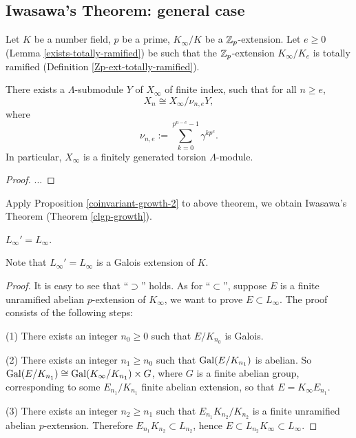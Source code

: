 \subsection{Iwasawa's Theorem: general case}

Let $K$ be a number field, $p$ be a prime,
$K_\infty/K$ be a ${\mathbb {Z}}_p$-extension.
Let $e\geq 0$ (Lemma \ref{exists-totally-ramified})
be such that the ${\mathbb {Z}}_p$-extension $K_\infty/K_e$
is totally ramified (Definition \ref{Zp-ext-totally-ramified}).

\begin{thm}
\label{Xn-isom-qout}
There exists a $\Lambda$-submodule $Y$ of $X_\infty$ of finite index,
such that for all $n\geq e$,
$$
X_n\cong X_\infty/\nu_{n,e}Y,
$$
where
$$
\nu_{n,e}:=\sum_{k=0}^{p^{n-e}-1}\gamma^{kp^e}.
$$
In particular, $X_\infty$ is a finitely generated torsion $\Lambda$-module.
\end{thm}

\begin{proof}
...
\end{proof}

Apply Proposition \ref{coinvariant-growth-2} to above theorem,
we obtain Iwasawa's Theorem (Theorem \ref{clgp-growth}).

\iffalse
\begin{prop}
\label{Zp-ext-L-eq-L}
$L_\infty'=L_\infty$.
\end{prop}

Note that $L_\infty'=L_\infty$ is a Galois extension of $K$.

\begin{proof}
It is easy to see that ``$\supset$'' holds.
As for ``$\subset$'', suppose $E$ is a finite
unramified abelian $p$-extension of $K_\infty$,
we want to prove $E\subset L_\infty$. The proof consists of the following steps:

(1) There exists an integer $n_0\geq 0$ such that $E/K_{n_0}$ is Galois.

(2) There exists an integer $n_1\geq n_0$ such that ${\mathrm{Gal}}(E/K_{n_1})$ is abelian.
So ${\mathrm{Gal}}(E/K_{n_1})\cong{\mathrm{Gal}}(K_\infty/K_{n_1})\times G$,
where $G$ is a finite abelian group, corresponding to some $E_{n_1}/K_{n_1}$
finite abelian extension, so that $E=K_\infty E_{n_1}$.

(3) There exists an integer $n_2\geq n_1$ such that $E_{n_1}K_{n_2}/K_{n_2}$
is a finite unramified abelian $p$-extension. Therefore $E_{n_1}K_{n_2}\subset L_{n_2}$,
hence $E\subset L_{n_2}K_\infty\subset L_\infty$.
\end{proof}

